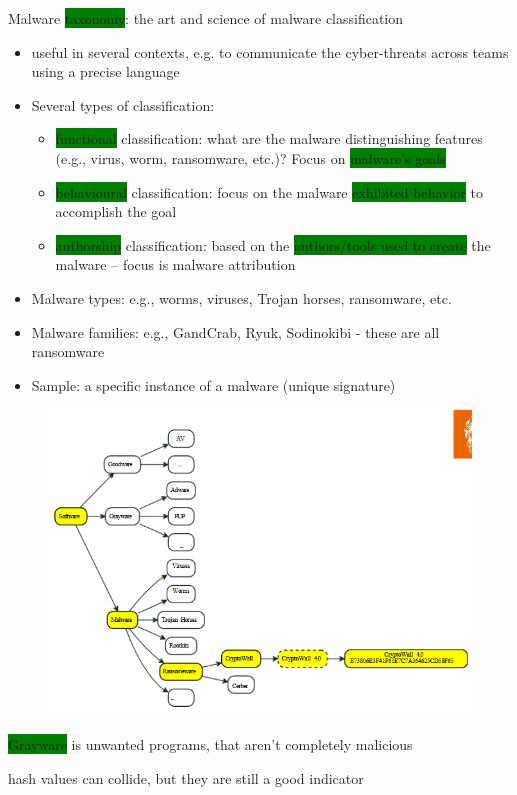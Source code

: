 \documentclass[]{project_plan}
\begin{document}
Malware \colorbox{green}{taxonomy}: the art and science of malware classification
\begin{itemize}
  \item useful in several contexts, e.g. to communicate the cyber-threats across teams using a precise language
  \item Several types of classification:
        \begin{itemize}
          \item \colorbox{green}{functional} classification: what are the malware distinguishing features (e.g., virus, worm, ransomware, etc.)? Focus
                on \colorbox{green}{malware’s goals}
          \item \colorbox{green}{behavioural} classification: focus on the malware \colorbox{green}{exhibited behavior} to accomplish the goal
          \item \colorbox{green}{authorship} classification: based on the \colorbox{green}{authors/tools used to create} the malware – focus is malware attribution
        \end{itemize}
  \item Malware types: e.g., worms, viruses, Trojan horses, ransomware, etc.
  \item Malware families: e.g., GandCrab, Ryuk, Sodinokibi - these are all ransomware
  \item Sample: a specific instance of a malware (unique signature)
\end{itemize}

\begin{figure}[H]
  \centering
  \includegraphics*[width=.7\linewidth]{taxonomy.png}
\end{figure}

\colorbox{green}{Grayware} is unwanted programs, that aren't completely malicious

hash values can collide, but they are still a good indicator
\end{document}
